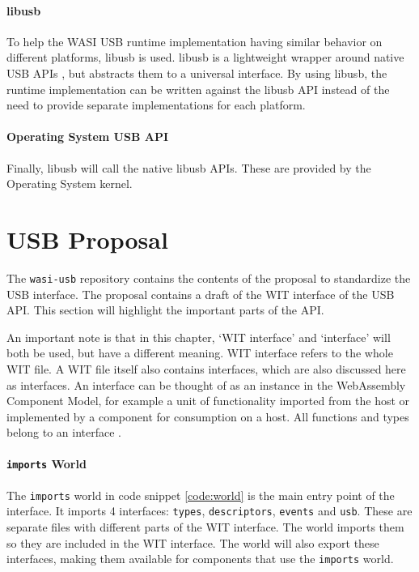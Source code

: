 \paragraph{libusb} To help the \acrshort{WASI} \acrshort{USB} runtime implementation having similar behavior on different platforms, libusb is used. libusb is a lightweight wrapper around native USB APIs \cite{LibUSB}, but abstracts them to a universal interface. By using libusb, the runtime implementation can be written against the libusb API instead of the need to provide separate implementations for each platform.

\paragraph{Operating System USB API} Finally, libusb will call the native libusb APIs. These are provided by the Operating System kernel.

\section{USB Proposal}
\label{section:usb_proposal}
The \texttt{wasi-usb} repository \cite{wasi_usb} contains the contents of the proposal to standardize the USB interface. The proposal contains a draft of the \acrshort{WIT} interface of the USB API. This section will highlight the important parts of the API.

An important note is that in this chapter, `WIT interface' and `interface' will both be used, but have a different meaning.
\acrshort{WIT} interface refers to the whole WIT file.
A WIT file itself also contains interfaces, which are also discussed here as interfaces. An interface can be thought of as an instance in the WebAssembly Component Model, for example a unit of functionality imported from the host or implemented by a component for consumption on a host. All functions and types belong to an interface \cite{wit_interfaces}.

\paragraph{\texttt{imports} World}
The \texttt{imports} world in code snippet \ref{code:world} is the main entry point of the interface. It imports 4 interfaces: \texttt{types}, \texttt{descriptors}, \texttt{events} and \texttt{usb}. These are separate files with different parts of the WIT interface. The world imports them so they are included in the WIT interface. The world will also export these interfaces, making them available for components that use the \texttt{imports} world.\\

